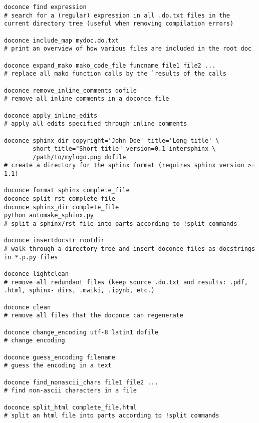 \documentclass[%
oneside,                 %
final,                   %
10pt]{article}
\newcounter{doconce:movie:counter}
\begin{document}
\begin{Verbatim}[numbers=none,fontsize=\fontsize{9pt}{9pt},baselinestretch=0.95,xleftmargin=2mm]
doconce find expression                                                
# search for a (regular) expression in all .do.txt files in the current directory tree (useful when removing compilation errors)

doconce include_map mydoc.do.txt                                       
# print an overview of how various files are included in the root doc

doconce expand_mako mako_code_file funcname file1 file2 ...            
# replace all mako function calls by the `results of the calls

doconce remove_inline_comments dofile                                  
# remove all inline comments in a doconce file

doconce apply_inline_edits                                             
# apply all edits specified through inline comments

doconce sphinx_dir copyright='John Doe' title='Long title' \
        short_title="Short title" version=0.1 intersphinx \
        /path/to/mylogo.png dofile 
# create a directory for the sphinx format (requires sphinx version >= 1.1)

doconce format sphinx complete_file 
doconce split_rst complete_file 
doconce sphinx_dir complete_file 
python automake_sphinx.py 
# split a sphinx/rst file into parts according to !split commands

doconce insertdocstr rootdir                                           
# walk through a directory tree and insert doconce files as docstrings in *.p.py files

doconce lightclean                                                     
# remove all redundant files (keep source .do.txt and results: .pdf, .html, sphinx- dirs, .mwiki, .ipynb, etc.)

doconce clean                                                          
# remove all files that the doconce can regenerate

doconce change_encoding utf-8 latin1 dofile                            
# change encoding

doconce guess_encoding filename                                        
# guess the encoding in a text

doconce find_nonascii_chars file1 file2 ...                            
# find non-ascii characters in a file

doconce split_html complete_file.html                                  
# split an html file into parts according to !split commands


\end{Verbatim}
\end{document}
